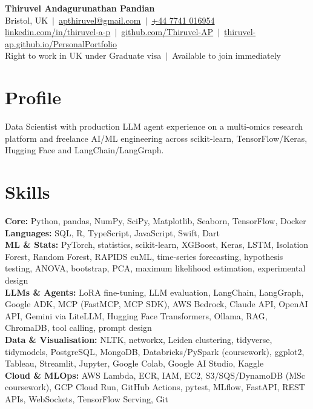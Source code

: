 \documentclass[a4paper,11pt]{article}
\begin{document}
\fontsize{11}{13.2}\selectfont

\begin{center}
  {\LARGE\bfseries Thiruvel Andagurunathan Pandian}\\[3pt]
  Bristol, UK \,$|$\, \href{mailto:apthiruvel@gmail.com}{apthiruvel@gmail.com} \,$|$\, \href{tel:+447741016954}{+44 7741 016954}\\[1pt]
\href{https://www.linkedin.com/in/thiruvel-a-p/}{linkedin.com/in/thiruvel-a-p} \,$|$\, \href{https://github.com/Thiruvel-AP}{github.com/Thiruvel-AP} \,$|$\, \href{https://thiruvel-ap.github.io/PersonalPortfolio/}{thiruvel-ap.github.io/PersonalPortfolio}\\[1pt]
  Right to work in UK under Graduate visa \,$|$\, Available to join immediately
\end{center}

\section{Profile}
Data Scientist with production LLM agent experience on a multi-omics research platform and freelance AI/ML engineering across scikit-learn, TensorFlow/Keras, Hugging Face and LangChain/LangGraph.

\section{Skills}
\textbf{Core:} Python, pandas, NumPy, SciPy, Matplotlib, Seaborn, TensorFlow, Docker\\[2pt]
\textbf{Languages:} SQL, R, TypeScript, JavaScript, Swift, Dart\\[2pt]
\textbf{ML \& Stats:} PyTorch, statistics, scikit-learn, XGBoost, Keras, LSTM, Isolation Forest, Random Forest, RAPIDS cuML, time-series forecasting, hypothesis testing, ANOVA, bootstrap, PCA, maximum likelihood estimation, experimental design\\[2pt]
\textbf{LLMs \& Agents:} LoRA fine-tuning, LLM evaluation, LangChain, LangGraph, Google ADK, MCP (FastMCP, MCP SDK), AWS Bedrock, Claude API, OpenAI API, Gemini via LiteLLM, Hugging Face Transformers, Ollama, RAG, ChromaDB, tool calling, prompt design\\[2pt]
\textbf{Data \& Visualisation:} NLTK, networkx, Leiden clustering, tidyverse, tidymodels, PostgreSQL, MongoDB, Databricks/PySpark (coursework), ggplot2, Tableau, Streamlit, Jupyter, Google Colab, Google AI Studio, Kaggle\\[2pt]
\textbf{Cloud \& MLOps:} AWS Lambda, ECR, IAM, EC2, S3/SQS/DynamoDB (MSc coursework), GCP Cloud Run, GitHub Actions, pytest, MLflow, FastAPI, REST APIs, WebSockets, TensorFlow Serving, Git
\end{document}
